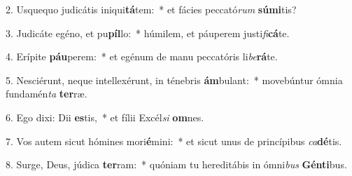 2. Usquequo judicátis iniqui\textbf{tá}tem:~*  et fácies peccató\textit{rum} \textbf{sú}\textbf{mi}tis?\

3. Judicáte egéno, et pu\textbf{píl}lo:~*  húmilem, et páuperem justi\textit{fi}\textbf{cá}te.\

4. Erípite \textbf{páu}perem:~*  et egénum de manu peccatóris li\textit{be}\textbf{rá}te.\

5. Nesciérunt, neque intellexérunt, in ténebris \textbf{ám}bulant:~*  movebúntur ómnia fundamén\textit{ta} \textbf{ter}ræ.\

6. Ego dixi: Dii \textbf{es}tis,~*  et fílii Excél\textit{si} \textbf{om}nes.\

7. Vos autem sicut hómines mori\textbf{é}mini:~*  et sicut unus de princípibus \textit{ca}\textbf{dé}tis.\

8. Surge, Deus, júdica \textbf{ter}ram:~*  quóniam tu hereditábis in ómni\textit{bus} \textbf{Gén}\textbf{ti}bus.\

